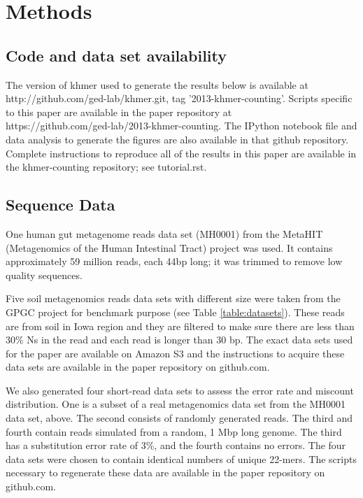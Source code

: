 \documentclass[10pt]{article}
\begin{document}
\section*{Methods}

\subsection*{Code and data set availability}


The version of khmer used to generate the results below is available
at http://github.com/ged-lab/khmer.git, tag '2013-khmer-counting'.
Scripts specific to this paper are available in the paper repository
at \\
https://github.com/ged-lab/2013-khmer-counting.
The IPython\cite{4160251} notebook file and data analysis to generate the figures are also
available in that github repository.  Complete instructions to reproduce
all of the results in this paper are available in the khmer-counting
repository; see tutorial.rst.

\subsection*{Sequence Data}

One human gut metagenome reads data set (MH0001) from the 
MetaHIT (Metagenomics of the Human Intestinal Tract) project \cite{Qin2010} was used. 
It contains approximately 59 million reads, each 44bp long; it was trimmed to remove 
low quality sequences. 

Five soil metagenomics reads data sets with different size were taken
from the GPGC project for benchmark purpose (see Table
\ref{table:datasets}).  These reads are from soil in Iowa region and they
are filtered to make sure there are less than 30\% Ns in the read and
each read is longer than 30 bp.  The exact data sets used for the
paper are available on Amazon S3 and the instructions to acquire these
data sets are available in the paper repository on github.com.

We also generated four short-read data sets to assess the error
rate and miscount distribution. One is a subset of a real
metagenomics data set from the MH0001 data set, above. The second
consists of randomly generated reads. The third and fourth contain
reads simulated from a random, 1 Mbp long genome.  The third has a
substitution error rate of 3\%, and the fourth contains no errors. The
four data sets were chosen to contain identical numbers of unique
22-mers.  The scripts necessary to regenerate these data are available
in the paper repository on github.com.
\end{document}
